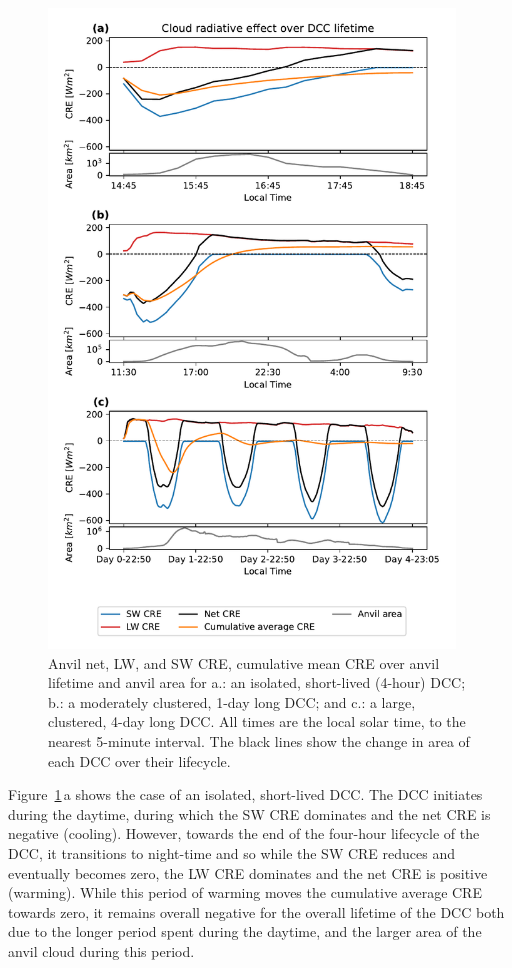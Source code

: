 \documentclass[acp, manuscript]{copernicus}
\begin{document}
\begin{figure}[tp]
    \centering
    \includegraphics[width=10.8cm]{figures/fig10.pdf}
    \caption[
    Anvil net, LW, and SW CRE, cumulative mean CRE over anvil lifetime
    ]{
    Anvil net, LW, and SW CRE, cumulative mean CRE over anvil lifetime and anvil area for a.: an isolated, short-lived (4-hour) DCC; b.: a moderately clustered, 1-day long DCC; and c.: a large, clustered, 4-day long DCC. All times are the local solar time, to the nearest 5-minute interval. The black lines show the change in area of each DCC over their lifecycle.
    }
    \label{fig:cre_lifecycle_examples}
\end{figure}


Figure~\ref{fig:cre_lifecycle_examples}\,a shows the case of an isolated, short-lived DCC. 
The DCC initiates during the daytime, during which the SW CRE dominates and the net CRE is negative (cooling). 
However, towards the end of the four-hour lifecycle of the DCC, it transitions to night-time and so while the SW CRE reduces and eventually becomes zero, the LW CRE dominates and the net CRE is positive (warming). 
While this period of warming moves the cumulative average CRE towards zero, it remains overall negative for the overall lifetime of the DCC both due to the longer period spent during the daytime, and the larger area of the anvil cloud during this period.
\end{document}
